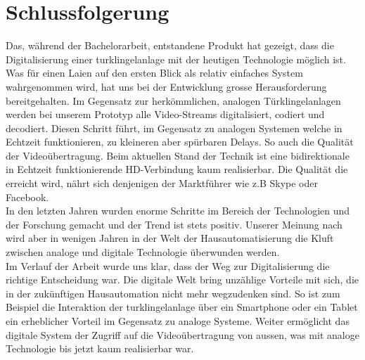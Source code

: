 \newpage

\section{Schlussfolgerung}
\label{sec:schlussfolgerung}
Das, während der Bachelorarbeit, entstandene Produkt hat gezeigt, dass die Digitalisierung einer \gls{turklingelanlage} mit der heutigen Technologie möglich ist. Was für einen Laien auf den ersten Blick als relativ einfaches System wahrgenommen wird, hat uns bei der Entwicklung grosse Herausforderung bereitgehalten. Im Gegensatz zur herkömmlichen, analogen Türklingelanlagen werden bei unserem Prototyp alle Video-Streams digitalisiert, codiert und decodiert. Diesen Schritt führt, im Gegensatz zu analogen Systemen welche in Echtzeit funktionieren, zu kleineren aber spürbaren Delays. So auch die Qualität der Videoübertragung. Beim aktuellen Stand der Technik ist eine bidirektionale in Echtzeit funktionierende HD-Verbindung kaum realisierbar. Die Qualität die erreicht wird, nährt sich denjenigen der Marktführer wie z.B Skype oder Facebook.
\\
In den letzten Jahren wurden enorme Schritte im Bereich der Technologien und der Forschung gemacht und der Trend ist stets positiv. Unserer Meinung nach wird aber in wenigen Jahren in der Welt der Hausautomatisierung die Kluft zwischen analoge und digitale Technologie überwunden werden.
\\
Im Verlauf der Arbeit wurde uns klar, dass der Weg zur Digitalisierung die richtige Entscheidung war. Die digitale Welt bring unzählige Vorteile mit sich, die in der zukünftigen Hausautomation nicht mehr wegzudenken sind. So ist zum Beispiel die Interaktion der \gls{turklingelanlage} über ein Smartphone oder ein Tablet ein erheblicher Vorteil im Gegensatz zu analoge Systeme. Weiter ermöglicht das digitale System der Zugriff auf die Videoübertragung von aussen, was mit analoge Technologie bis jetzt kaum realisierbar war.
\\
   

    



  
